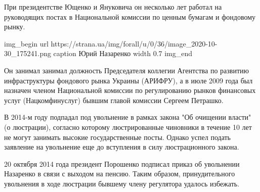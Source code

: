 При президентстве Ющенко и Януковича он несколько лет работал на руководящих
постах в Национальной комиссии по ценным бумагам и фондовому рынку.
  
\ifcmt
img_begin 
  url https://strana.ua/img/forall/u/0/36/image_2020-10-30_175241.png
  caption Юрий Назаренко
  width 0.7
img_end
\fi  

Он занимал занимал должность Председателя коллегии Агентства по развитию
инфраструктуры фондового рынка Украины (АРИФРУ), а в июле 2009 года был
назначен членом Национальной комиссии по регулированию рынков финансовых услуг
(Нацкомфинуслуг) бывшим главой комиссии Сергеем Петрашко.

В 2014-м году подпадал под увольнение в рамках закона "Об очищении власти" (о
люстрации), согласно которому люстрированные чиновники в течение 10 лет не
могут занимать высокие государственные посты. Однако успел подать заявление на
увольнение еще до вступления в силу люстрационного закона.

20 октября 2014 года президент Порошенко подписал приказ об увольнении
Назаренко в связи с выходом на пенсию. Таким образом, принудительного
увольнения в ходе люстрации бывшему члену регулятора удалось избежать.
